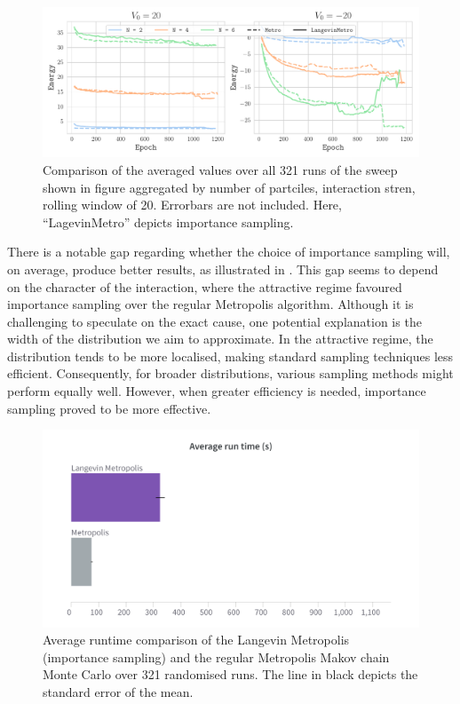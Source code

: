 \begin{figure}[H]
    \centering
    \includegraphics[width=0.9\linewidth]{Chapters/Results/N2/lmh_vs_m.pdf}
    \caption{Comparison of the averaged values over all 321 runs of the sweep shown in figure  aggregated by number of partciles, interaction stren, rolling window of 20. Errorbars are not included. Here, ``LagevinMetro'' depicts importance sampling.}
    \label{fig:comparison_sampling}
\end{figure}

There is a notable gap regarding whether the choice of importance sampling will, on average, produce better results, as illustrated in . This gap seems to depend on the character of the interaction, where the attractive regime favoured importance sampling over the regular Metropolis algorithm. Although it is challenging to speculate on the exact cause, one potential explanation is the width of the distribution we aim to approximate. In the attractive regime, the distribution tends to be more localised, making standard sampling techniques less efficient. Consequently, for broader distributions, various sampling methods might perform equally well. However, when greater efficiency is needed, importance sampling proved to be more effective.

\begin{figure}[H]
    \centering
    \includegraphics[width=0.7\linewidth]{Chapters/Results/N2/avg_run_time_lm_m.png}
    \caption{Average runtime comparison of the Langevin Metropolis (importance sampling) and the regular Metropolis Makov chain Monte Carlo over 321 randomised runs. The line in black depicts the standard error of the mean.}
    \label{fig:time_metro_langevin}
\end{figure}

